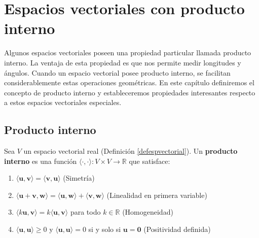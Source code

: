 \chapter{Espacios vectoriales con producto interno}\label{evcpir}

Algunos espacios vectoriales poseen una propiedad particular llamada producto interno. La ventaja de esta propiedad es que nos permite medir longitudes y ángulos. Cuando un espacio vectorial posee producto interno, se facilitan considerablemente estas operaciones geométricas. En este capítulo definiremos el concepto de producto interno y estableceremos propiedades interesantes respecto a estos espacios vectoriales especiales.

\section{Producto interno}

\begin{definition}
Sea $V$ un espacio vectorial real (Definición \ref{defespvectorial}). Un \textbf{producto interno} es una función $\langle \cdot, \cdot \rangle: V \times V \to \mathbb{R}$ que satisface:
\begin{enumerate}[$1.$]
    \item $\langle \mathbf{u},\mathbf{v} \rangle = \langle \mathbf{v},\mathbf{u} \rangle$ (Simetría)
    \item $\langle \mathbf{u} + \mathbf{v},\mathbf{w} \rangle = \langle \mathbf{u},\mathbf{w} \rangle + \langle \mathbf{v},\mathbf{w} \rangle$ (Linealidad en primera variable)
    \item $\langle k\mathbf{u},\mathbf{v} \rangle = k\langle \mathbf{u},\mathbf{v} \rangle$ para todo $k \in \mathbb{R}$ (Homogeneidad)
    \item $\langle \mathbf{u},\mathbf{u} \rangle \geq 0$ y $\langle \mathbf{u},\mathbf{u} \rangle = 0$ si y solo si $\mathbf{u} = \mathbf{0}$ (Positividad definida)
\end{enumerate}
\end{definition}

